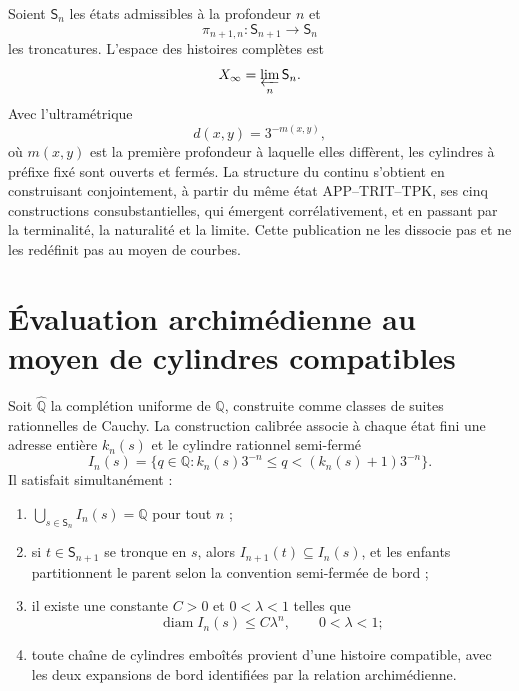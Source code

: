 Soient \(\mathsf S_n\) les états admissibles à la profondeur \(n\) et
\[
 \pi_{n+1,n}:\mathsf S_{n+1}\longrightarrow\mathsf S_n
\]
les troncatures. L'espace des histoires complètes est
\[
 X_\infty=\varprojlim_n\mathsf S_n.
\]
Avec l'ultramétrique
\[
 d(x,y)=3^{-m(x,y)},
\]
où \(m(x,y)\) est la première profondeur à laquelle elles diffèrent, les cylindres à préfixe fixé sont ouverts et fermés. La structure du continu s'obtient en construisant conjointement, à partir du même état APP--TRIT--TPK, ses cinq constructions consubstantielles, qui émergent corrélativement, et en passant par la terminalité, la naturalité et la limite. Cette publication ne les dissocie pas et ne les redéfinit pas au moyen de courbes.

\section{Évaluation archimédienne au moyen de cylindres compatibles}

Soit \(\widehat{\mathbb Q}\) la complétion uniforme de \(\mathbb Q\), construite comme classes de suites rationnelles de Cauchy. La construction calibrée associe à chaque état fini une adresse entière \(k_n(s)\) et le cylindre rationnel semi-fermé
\[
 I_n(s)=\{q\in\mathbb Q:k_n(s)3^{-n}\le q<(k_n(s)+1)3^{-n}\}.
\]
Il satisfait simultanément :
\begin{enumerate}[label=\textup{(A\arabic*)}]
\item \(\bigcup_{s\in\mathsf S_n}I_n(s)=\mathbb Q\) pour tout \(n\) ;
\item si \(t\in\mathsf S_{n+1}\) se tronque en \(s\), alors \(I_{n+1}(t)\subseteq I_n(s)\), et les enfants partitionnent le parent selon la convention semi-fermée de bord ;
\item il existe une constante \(C>0\) et \(0<\lambda<1\) telles que
\[
 \operatorname{diam}I_n(s)\le C\lambda^n,
 \qquad 0<\lambda<1;
\]
\item toute chaîne de cylindres emboîtés provient d'une histoire compatible, avec les deux expansions de bord identifiées par la relation archimédienne.
\end{enumerate}

